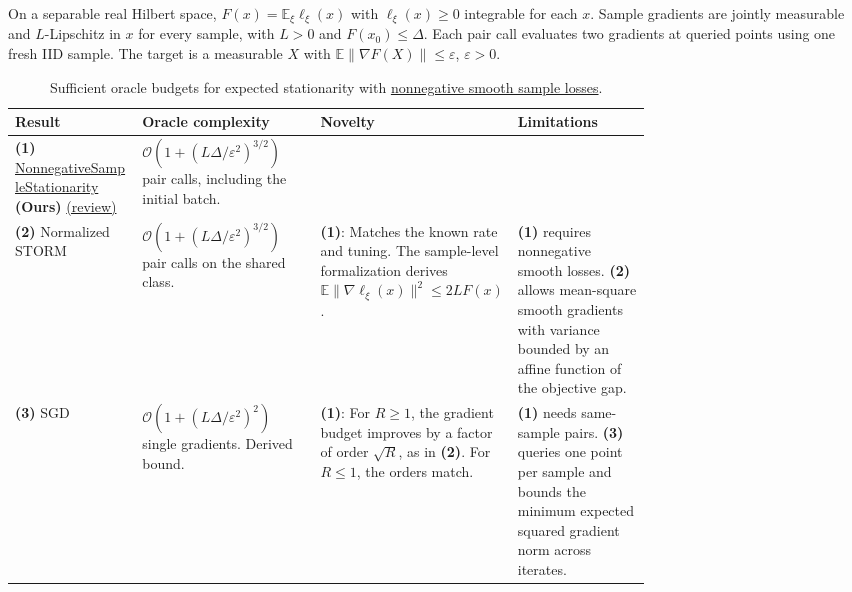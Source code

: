 \begin{table}[tp]
\centering
\caption{Sufficient oracle budgets for expected stationarity with \href{https://github.com/k3nfalt/longtails/blob/main/LongTails/Setups/NonnegativeSmoothSampleLoss.lean}{nonnegative smooth sample losses}.}\label{tab:NonnegativeSmoothSampleLoss}
\parbox{\linewidth}{\footnotesize On a separable real Hilbert space, $F(x)=\mathbb E_\xi\ell_\xi(x)$ with $\ell_\xi(x)\ge0$ integrable for each $x$. Sample gradients are jointly measurable and $L$-Lipschitz in $x$ for every sample, with $L>0$ and $F(x_0)\le\Delta$. Each pair call evaluates two gradients at queried points using one fresh IID sample. The target is a measurable $X$ with $\mathbb E\|\nabla F(X)\|\le\varepsilon$, $\varepsilon>0$.}\par\smallskip
\begin{threeparttable}
\footnotesize
\setlength{\tabcolsep}{4pt}\renewcommand{\arraystretch}{1.25}
\begin{tabularx}{\linewidth}{@{}>{\raggedright\arraybackslash}p{0.20\linewidth}>{\raggedright\arraybackslash}p{0.28\linewidth}>{\raggedright\arraybackslash}p{0.26\linewidth}>{\raggedright\arraybackslash}X@{}}
\toprule
\textbf{Result} & \textbf{Oracle complexity} & \textbf{Novelty} & \textbf{Limitations} \\
\midrule
\textbf{(1)} \href{https://github.com/k3nfalt/longtails/blob/main/LongTails/Theorems/NonnegativeSampleStationarity.lean}{Nonnegative\allowbreak Sample\allowbreak Stationarity} \textbf{(Ours)} \href{https://github.com/k3nfalt/longtails/blob/main/scripts/reviews/NonnegativeSampleStationarity.md}{(review)}
& $\mathcal{O}(1+(L\Delta/\varepsilon^2)^{3/2})$ pair calls, including the initial batch. & & \\
\midrule[1.2pt]
\textbf{(2)} Normalized STORM \citep{nsslRepoStorm2026}
& $\mathcal{O}(1+(L\Delta/\varepsilon^2)^{3/2})$ pair calls on the shared class.
& \textbf{(1)}: Matches the known rate and tuning. The sample-level formalization derives $\mathbb E\|\nabla\ell_\xi(x)\|^2\le 2LF(x)$.
& \textbf{(1)} requires nonnegative smooth losses. \textbf{(2)} allows mean-square smooth gradients with variance bounded by an affine function of the objective gap. \\
\midrule
\textbf{(3)} SGD \citep[Cor.~1]{avmKhaledRichtarik2020v3}
& $\mathcal{O}(1+(L\Delta/\varepsilon^2)^2)$ single gradients. Derived bound.
& \textbf{(1)}: For $R\ge1$, the gradient budget improves by a factor of order $\sqrt R$, as in \textbf{(2)}. For $R\le1$, the orders match.
& \textbf{(1)} needs same-sample pairs. \textbf{(3)} queries one point per sample and bounds the minimum expected squared gradient norm across iterates. \\

\end{tabularx}
\end{threeparttable}
\end{table}

